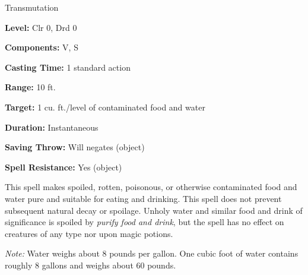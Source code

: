 
Transmutation

\textbf{Level:} Clr 0, Drd 0

\textbf{Components:} V, S

\textbf{Casting Time:} 1 standard action

\textbf{Range:} 10 ft.

\textbf{Target:} 1 cu. ft./level of contaminated food and water

\textbf{Duration:} Instantaneous

\textbf{Saving Throw:} Will negates (object)

\textbf{Spell Resistance:} Yes (object)

This spell makes spoiled, rotten, poisonous, or otherwise contaminated food and 
water pure and suitable for eating and drinking. This spell does not prevent subsequent 
natural decay or spoilage. Unholy water and similar food and drink of significance 
is spoiled by \textit{purify food and drink}, but the spell has no effect on creatures 
of any type nor upon magic potions.

\textit{Note:} Water weighs about 8 pounds per gallon. One cubic foot of water 
contains roughly 8 gallons and weighs about 60 pounds.

